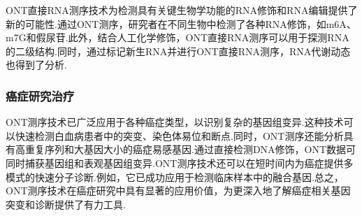 ONT直接RNA测序技术为检测具有关键生物学功能的RNA修饰和RNA编辑提供了新的可能性.通过ONT测序，研究者在不同生物中检测了各种RNA修饰\cite{garalde2018highly}，如m6A、m7G和假尿苷.此外，结合人工化学修饰，ONT直接RNA测序可以用于探测RNA的二级结构.同时，通过标记新生RNA并进行ONT直接RNA测序，RNA代谢动态也得到了分析.

\subsubsection{癌症研究治疗}

ONT测序技术已广泛应用于各种癌症类型，以识别复杂的基因组变异.这种技术可以快速检测白血病患者中的突变、染色体易位和断点.同时，ONT测序还能分析具有高重复序列和大基因大小的癌症易感基因.通过直接检测DNA修饰\cite{euskirchen2017same}，ONT数据可同时捕获基因组和表观基因组变异.ONT测序技术还可以在短时间内为癌症提供多模式的快速分子诊断.例如，它已成功应用于检测临床样本中的融合基因\cite{jeck2019nanopore}.总之，ONT测序技术在癌症研究中具有显著的应用价值，为更深入地了解癌症相关基因突变和诊断提供了有力工具.